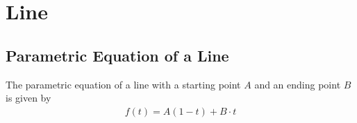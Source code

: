 \section{Line}
\subsection{Parametric Equation of a Line}
The parametric equation of a line with a starting point $A$ and an ending point $B$ is given by
\begin{align*}
f\left(t\right) = A \left(1 - t\right) + B \cdot t 
\end{align*}
